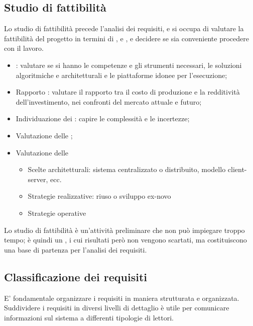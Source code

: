 \subsection{Studio di fattibilità}
\label{sub:studio_di_fattibilita}

Lo studio di fattibilità precede l'analisi dei requisiti, e si occupa di
valutare la fattibilità del progetto in termini di ,
 e , e decidere se sia conveniente procedere con
il lavoro.

\begin{itemize}
  \item {}: valutare se si hanno le
    competenze e gli strumenti necessari, le soluzioni algoritmiche e
    architetturali e le piattaforme idonee per l'esecuzione;
  \item Rapporto : valutare il rapporto tra il costo di
    produzione e la redditività dell'investimento, nei confronti del mercato
    attuale e futuro;
  \item Individuazione dei : capire le complessità e le
    incertezze;
  \item Valutazione delle ;
  \item Valutazione delle 

    \begin{itemize}
      \item Scelte architetturali: sistema centralizzato o distribuito, modello
            client-server, ecc.
      \item Strategie realizzative: riuso o sviluppo ex-novo
      \item Strategie operative
    \end{itemize}

\end{itemize}

Lo studio di fattibilità è un'attività preliminare che non può impiegare troppo
tempo; è quindi un , i cui risultati però non vengono
scartati, ma costituiscono una base di partenza per l'analisi dei requisiti.

\subsection{Classificazione dei requisiti}
\label{sub:classificazione_dei_requisiti}

E' fondamentale organizzare i requisiti in maniera strutturata e organizzata.
Suddividere i requisiti in diversi livelli di dettaglio è utile per comunicare
informazioni sul sistema a differenti tipologie di lettori.

